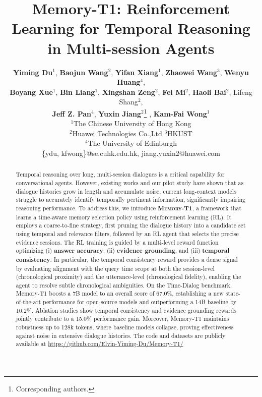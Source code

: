 \documentclass{article} %
\title{Memory-T1: Reinforcement Learning for Temporal Reasoning in Multi-session Agents}
\author{
\begin{tabular}{c}
  \textbf{Yiming Du}$^{1}$, \textbf{Baojun Wang}$^{2}$, \textbf{Yifan Xiang}$^{1}$, \textbf{Zhaowei Wang}$^{3}$, \textbf{Wenyu Huang}$^{4}$, \\ 
  \textbf{Boyang Xue}$^{1}$, \textbf{Bin Liang}$^{1}$, \textbf{Xingshan Zeng}$^{2}$, \textbf{Fei Mi}$^{2}$, \textbf{Haoli Bai}$^{2}$, Lifeng Shang$^{2}$, \\  \textbf{Jeff Z. Pan}$^{4}$, 
  \textbf{Yuxin Jiang}$^{2}$\thanks{Corresponding authors.} , \textbf{Kam-Fai Wong}$^{1}$\footnotemark[1] \\[1.5ex]
  \textnormal{$^1$The Chinese University of Hong Kong} \\
  \textnormal{$^2$Huawei Technologies Co.,Ltd} \textnormal{$^3$HKUST} \\
  \textnormal{$^4$The University of Edinburgh} \\
  \textnormal{\{ydu, kfwong\}@se.cuhk.edu.hk, jiang.yuxin2@huawei.com}
\end{tabular}
}
\begin{document}
\maketitle
\begin{abstract}




Temporal reasoning over long, multi-session dialogues is a critical capability for conversational agents. However, existing works and our pilot study have shown that as dialogue histories grow in length and accumulate noise, current long-context models struggle to accurately identify temporally pertinent information, significantly impairing reasoning performance. To address this, we introduce \textsc{\textbf{Memory-T1}}, a framework that learns a time-aware memory selection policy using reinforcement learning (RL). It employs a coarse-to-fine strategy, first pruning the dialogue history into a candidate set using temporal and relevance filters, followed by an RL agent that selects the precise evidence sessions. The RL training is guided by a multi-level reward function optimizing (i) \textbf{answer accuracy}, (ii) \textbf{evidence grounding}, and (iii) \textbf{temporal consistency}. In particular, the temporal consistency reward provides a dense signal by evaluating alignment with the query time scope at both the session-level (chronological proximity) and the utterance-level (chronological fidelity), enabling the agent to resolve subtle chronological ambiguities. On the Time-Dialog benchmark, Memory-T1 boosts a 7B model to an overall score of 67.0\%, establishing a new state-of-the-art performance for open-source models and outperforming a 14B baseline by 10.2\%. Ablation studies show temporal consistency and evidence grounding rewards jointly contribute to a 15.0\% performance gain. Moreover, Memory-T1 maintains robustness up to 128k tokens, where baseline models collapse, proving effectiveness against noise in extensive dialogue histories. The code and datasets are publicly available at \url{ https://github.com/Elvin-Yiming-Du/Memory-T1/}
\end{abstract}
\end{document}
